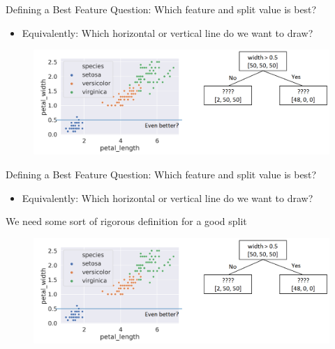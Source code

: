 \documentclass[aspectratio=169]{../latex_main/tntbeamer}  %
\begin{document}
	\begin{frame}{Defining a Best Feature}
	    Question: Which feature and split value is best?
	    \begin{itemize}
	        \item  Equivalently: Which horizontal or vertical line do we want to draw?
	    \end{itemize}
	    \begin{figure}
	        \centering
	        \includegraphics[scale=.4]{Bild45}
	    \end{figure}
	\end{frame}
	
	
	\begin{frame}{Defining a Best Feature}
	    Question: Which feature and split value is best?
	    \begin{itemize}
	        \item  Equivalently: Which horizontal or vertical line do we want to draw?
	    \end{itemize}
	    We need some sort of rigorous definition for a good split
	    \begin{figure}
	        \centering
	        \includegraphics[scale=.4]{Bild45}
	    \end{figure}
	\end{frame}
	
\end{document}
